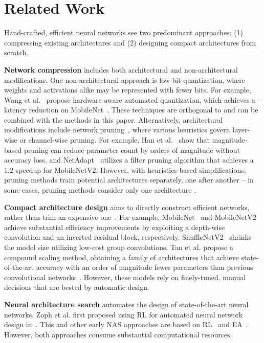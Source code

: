 \documentclass[10pt,twocolumn,letterpaper]{article}
\begin{document}
\section{Related Work}

Hand-crafted, efficient neural networks see two predominant approaches: (1) compressing existing architectures and (2) designing compact architectures from scratch.

\textbf{Network compression} includes both architectural and non-architectural modifications. One non-architectural approach is low-bit quantization, where weights and activations alike may be represented with fewer bits.  For example, Wang et al.~\cite{haq} propose hardware-aware automated quantization, which achieves a - latency reduction on MobileNet~\cite{mobilenet}. These techniques are orthogonal to and can be combined with the methods in this paper. Alternatively, architectural modifications include network pruning~\cite{netprune, structured_sparsity, energy_aware}, where various heuristics govern layer-wise or channel-wise pruning. For example, Han et al.~\cite{netprune} show that magnitude-based pruning can reduce parameter count by orders of magnitude without accuracy loss, and NetAdapt~\cite{netadapt} utilizes a filter pruning algorithm that achieves a 1.2 speedup for MobileNetV2. However, with heuristics-based simplifications, pruning methods train potential architectures separately, one after another -- in some cases, pruning methods consider only one architecture \cite{liu2017slimming, he2018sfp}.

\textbf{Compact architecture design} aims to directly construct efficient networks, rather than trim an expensive one~\cite{squeezenet, squeezedet}.  For example, MobileNet~\cite{mobilenet} and MobileNetV2~\cite{mobilenetv2} achieve substantial efficiency improvements by exploiting a depth-wise convolution and an inverted residual block, respectively.  ShuffleNetV2~\cite{shufflenetv2} shrinks the model size utilizing low-cost group convolutions. Tan et al. propose a compound scaling method, obtaining a family of architectures that achieve state-of-the-art accuracy with an order of magnitude fewer parameters than previous convolutional networks~\cite{efficientnet}. However, these models rely on finely-tuned, manual decisions that are bested by automatic design.

\textbf{Neural architecture search} automates the design of state-of-the-art neural networks. Zoph et al. first proposed using RL for automated neural network design in~\cite{NASRL}. This and other early NAS approaches are based on RL~\cite{NASRL, mnasnet} and EA~\cite{evolution}. However, both approaches consume substantial computational resources.
\end{document}
